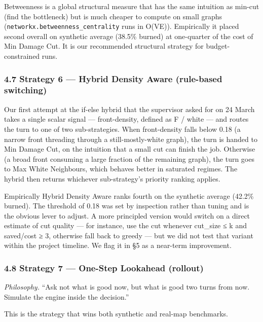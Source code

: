 \documentclass[
  11pt,
]{article}
\begin{document}
Betweenness is a global structural measure that has the same intuition
as min-cut (find the bottleneck) but is much cheaper to compute on small
graphs (\texttt{networkx.betweenness\_centrality} runs in O(VE)).
Empirically it placed second overall on synthetic average (38.5\%
burned) at one-quarter of the cost of Min Damage Cut. It is our
recommended structural strategy for budget-constrained runs.

\subsubsection{4.7 Strategy 6 --- Hybrid Density Aware (rule-based
switching)}\label{strategy-6-hybrid-density-aware-rule-based-switching}

Our first attempt at the if-else hybrid that the supervisor asked for on
24 March takes a single scalar signal --- front-density, defined as
\textbar F\textbar{} / \textbar white\textbar{} --- and routes the turn
to one of two sub-strategies. When front-density falls below 0.18 (a
narrow front threading through a still-mostly-white graph), the turn is
handed to Min Damage Cut, on the intuition that a small cut can finish
the job. Otherwise (a broad front consuming a large fraction of the
remaining graph), the turn goes to Max White Neighbours, which behaves
better in saturated regimes. The hybrid then returns whichever
sub-strategy's priority ranking applies.

Empirically Hybrid Density Aware ranks fourth on the synthetic average
(42.2\% burned). The threshold of 0.18 was set by inspection rather than
tuning and is the obvious lever to adjust. A more principled version
would switch on a direct estimate of cut quality --- for instance, use
the cut whenever cut\_size ≤ k and saved/cost ≥ 3, otherwise fall back
to greedy --- but we did not test that variant within the project
timeline. We flag it in §5 as a near-term improvement.

\subsubsection{4.8 Strategy 7 --- One-Step Lookahead
(rollout)}\label{strategy-7-one-step-lookahead-rollout}

\emph{Philosophy.} ``Ask not what is good now, but what is good two
turns from now. Simulate the engine inside the decision.''

This is the strategy that wins both synthetic and real-map benchmarks.
\end{document}
